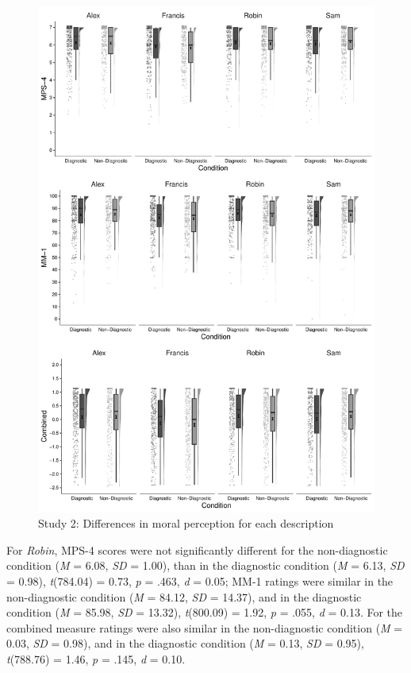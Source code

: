 \documentclass[
  man,floatsintext]{apa6}
\begin{document}
\begin{figure}[!p]
\includegraphics{Supplementary_files/figure-latex/S2allscenariosPlot-1} \caption{Study 2: Differences in moral perception for each description}\label{fig:S2allscenariosPlot}
\end{figure}

For \emph{Robin}, MPS-4 scores were not significantly different for the non-diagnostic condition (\emph{M} = 6.08, \emph{SD} = 1.00), than in the diagnostic condition (\emph{M} = 6.13, \emph{SD} = 0.98), \emph{t}(784.04) = 0.73, \emph{p} = .463, \emph{d} = 0.05; MM-1 ratings were similar in the non-diagnostic condition (\emph{M} = 84.12, \emph{SD} = 14.37), and in the diagnostic condition (\emph{M} = 85.98, \emph{SD} = 13.32), \emph{t}(800.09) = 1.92, \emph{p} = .055, \emph{d} = 0.13. For the combined measure ratings were also similar in the non-diagnostic condition (\emph{M} = 0.03, \emph{SD} = 0.98), and in the diagnostic condition (\emph{M} = 0.13, \emph{SD} = 0.95), \emph{t}(788.76) = 1.46, \emph{p} = .145, \emph{d} = 0.10.
\end{document}
